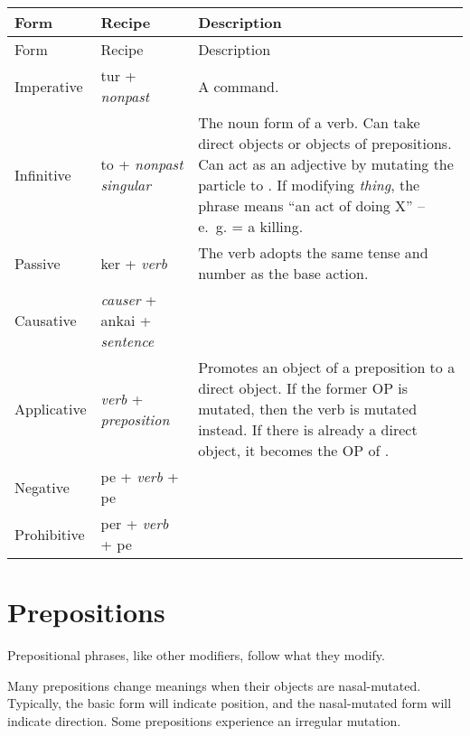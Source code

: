 \documentclass{book}
\begin{document}
\begin{longtabu}[c]{|l|l|X|}
    \hline
    Form & Recipe & Description \\
    \hline
    \endfirsthead
    
    \hline
    Form & Recipe & Description \\
    \hline
    \endhead
    
    \hline
    \endfoot
    
    \hline
    \endlastfoot
    
    Imperative & tur + \emph{nonpast} & A command. \\
    Infinitive & to + \emph{nonpast singular} & The noun form of a verb. Can take direct objects or objects of prepositions. Can act as an adjective by mutating the particle to . If modifying  \emph{thing}, the phrase means ``an act of doing X'' -- e.~g.  = a killing. \\
    Passive & ker + \emph{verb} & The verb adopts the same tense and number as the base action. \\
    Causative & \emph{causer} + ankai + \emph{sentence} & \\
    Applicative & \emph{verb} + \emph{preposition} & Promotes an object of a preposition to a direct object. If the former OP is mutated, then the verb is mutated instead. If there is already a direct object, it becomes the OP of . \\
    Negative & pe + \emph{verb} + pe & \\
    Prohibitive & per + \emph{verb} + pe & \\
\end{longtabu}

\chapter{Prepositions}

Prepositional phrases, like other modifiers, follow what they modify.

Many prepositions change meanings when their objects are nasal-mutated. Typically, the basic form will indicate position, and the nasal-mutated form will indicate direction. Some prepositions experience an irregular mutation.
\end{document}

